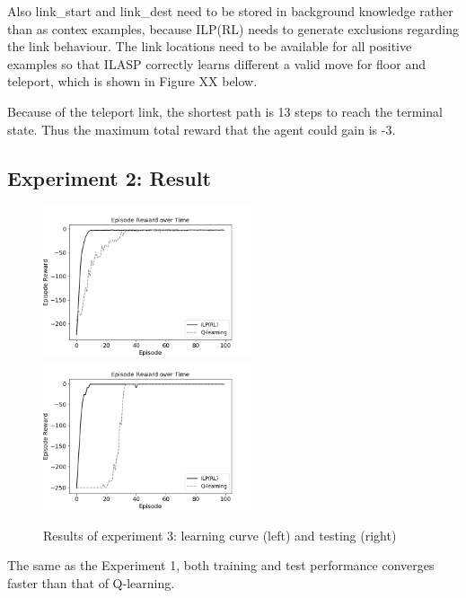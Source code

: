 Also link\_start and link\_dest need to be stored in background knowledge rather than as contex examples,
because ILP(RL) needs to generate exclusions regarding the link behaviour.
The link locations need to be available for all positive examples so that ILASP correctly learns different a valid move for floor and teleport, which is shown in Figure XX below.

Because of the teleport link, the shortest path is 13 steps to reach the terminal state. Thus the maximum total reward that the agent could gain is -3.

\subsection{Experiment 2: Result}
\label{subsec:experiment2_result}
    
\begin{figure}[!htb]
\centerline{
\includegraphics[width=0.55\textwidth]{./figures/experiment2_training}
\includegraphics[width=0.55\textwidth]{./figures/experiment2_test}
}
\caption{Results of experiment 3: learning curve (left) and testing (right)}
\label{experiment2_training}
\end{figure}

The same as the Experiment 1, both training and test performance converges faster than that of Q-learning.



